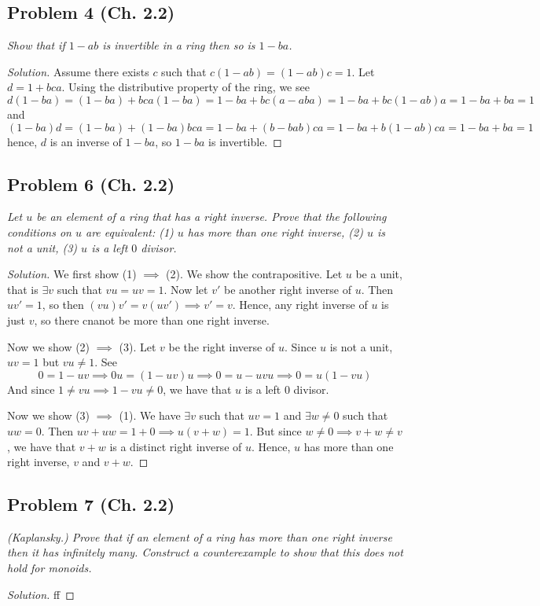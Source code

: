 \documentclass{article}
\begin{document}
\subsection*{Problem 4 (Ch. 2.2)}
{\it Show that if $1 - ab$ is invertible in a ring then so is $1 - ba$.}
\begin{proof}[Solution]\let\qed\relax
	Assume there exists $c$ such that $c(1-ab) = (1-ab)c = 1$.
	Let $d = 1 + bca$.
	Using the distributive property of the ring, we see
	\[
		d(1-ba) = (1 - ba) + bca(1 - ba)
		= 1 - ba + bc(a - aba) =
		1 - ba + bc(1 - ab)a = 1 - ba + ba = 1
	\]
	and
	\[
		(1-ba)d = (1 - ba) + (1 - ba)bca
		= 1 - ba + (b - bab)ca =
		1 - ba + b(1 - ab)ca = 1 - ba + ba = 1
	\]
	hence, $d$ is an inverse of $1 - ba$,
	so $1- ba$ is invertible.
\end{proof}

\subsection*{Problem 6 (Ch. 2.2)}
{\it Let $u$ be an element of a ring that has a right inverse.
Prove that the following conditions on $u$ are equivalent:
(1) $u$ has more than one right inverse,
(2) $u$ is not a unit,
(3) $u$ is a left $0$ divisor.}
\begin{proof}[Solution]\let\qed\relax
	We first show (1) $\implies$ (2).
	We show the contrapositive.
	Let $u$ be a unit, that is $\exists v$ such that $vu = uv = 1$.
	Now let $v'$ be another right inverse of $u$.
	Then $uv' = 1$, so
	then $(vu)v' = v(uv') \implies v' = v$.
	Hence, any right inverse of $u$ is just $v$,
	so there cnanot be more than one right inverse.

	Now we show (2) $\implies$ (3).
	Let $v$ be the right inverse of $u$.
	Since $u$ is not a unit, $uv = 1$ but $vu \neq 1$.
	See
	\[
		0 = 1 - uv \implies 0u = (1 - uv)u \implies
		0 = u - uvu \implies 0 = u(1-vu)
	\]
	And since $1 \neq vu \implies 1 - vu \neq 0$, we have that $u$
	is a left $0$ divisor.

	Now we show (3) $\implies$ (1).
	We have $\exists v$ such that $uv = 1$ and $\exists w\neq0$ such that $uw = 0$.
	Then $uv + uw = 1 + 0 \implies u(v + w) = 1$.
	But since $w \neq 0 \implies v + w \neq v$,
	we have that $v + w$ is a distinct right inverse of $u$.
	Hence, $u$ has more than one right inverse, $v$ and $v + w$.
\end{proof}

\subsection*{Problem 7 (Ch. 2.2)}
{\it (Kaplansky.) Prove that if an element of a ring has more than one
right inverse then it has infinitely many.
Construct a counterexample to show that this does not hold for monoids.}
\begin{proof}[Solution]\let\qed\relax
	ff
\end{proof}
\end{document}
